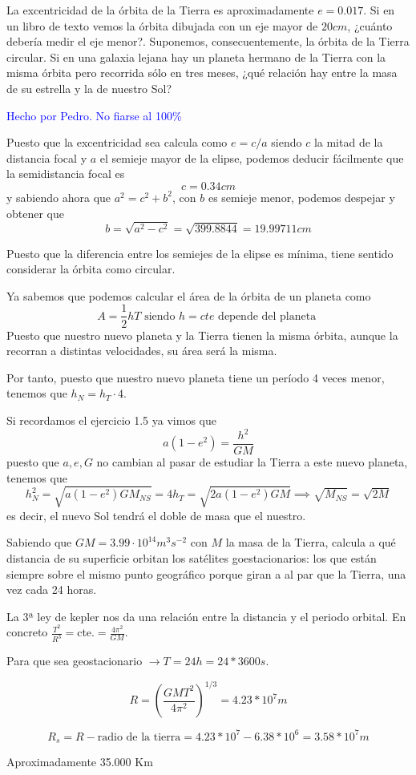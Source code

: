 \begin{problem}[8]
La excentricidad de la órbita de la Tierra es aproximadamente $e=0.017$. Si en un libro de texto vemos la órbita dibujada con un eje mayor de $20cm$, ¿cuánto debería medir el eje menor?. Suponemos, consecuentemente, la órbita de la Tierra circular. Si en una galaxia lejana hay un planeta hermano de la Tierra con la misma órbita pero recorrida sólo en tres meses, ¿qué relación hay entre la masa de su estrella y la de nuestro Sol?

\solution
\textcolor{blue}{Hecho por Pedro. No fiarse al 100\%}

Puesto que la excentricidad sea calcula como $e=c/a$ siendo $c$ la mitad de la distancia focal y $a$ el semieje mayor de la elipse, podemos deducir fácilmente que la semidistancia focal es
\[c= 0.34cm\]
y sabiendo ahora que $a^2 = c^2+b^2$, con $b$ es semieje menor, podemos despejar y obtener que
\[b = \sqrt{a^2-c^2}=\sqrt{399.8844} = 19.99711 cm\]

Puesto que la diferencia entre los semiejes de la elipse es mínima, tiene sentido considerar la órbita como circular.

Ya sabemos que podemos calcular el área de la órbita de un planeta como
\[A = \frac{1}{2}h T \text{ siendo } h = cte \text{ depende del planeta }\]
Puesto que nuestro nuevo planeta y la Tierra tienen la misma órbita, aunque la recorran a distintas velocidades, su área será la misma.

Por tanto, puesto que nuestro nuevo planeta tiene un período 4 veces menor, tenemos que $h_N=h_T \cdot 4$.

Si recordamos el ejercicio 1.5 ya vimos que
\[a(1-e^2)=\frac{h^2}{GM}\]
puesto que $a,e,G$ no cambian al pasar de estudiar la Tierra a este nuevo planeta, tenemos que
\[h_N^2=\sqrt{a(1-e^2)GM_{NS}}=4h_T=\sqrt{2a(1-e^2)GM} \implies \sqrt{M_{NS}}=\sqrt{2M}\]
es decir, el nuevo Sol tendrá el doble de masa que el nuestro.

\end{problem}

\begin{problem}[9]
Sabiendo que $GM=3.99\cdot 10^{14}m^3s^{-2}$ con $M$ la masa de la Tierra, calcula a qué distancia de su superficie orbitan los satélites goestacionarios: los que están siempre sobre el mismo punto geográfico porque giran a al par que la Tierra, una vez cada 24 horas.
\solution

La 3ª ley de kepler nos da una relación entre la distancia y el periodo orbital. En concreto $ \frac{T^2}{R^3} = $cte.$ = \frac{4\pi^2}{GM} $.

Para que sea geostacionario $\rightarrow T = 24h = 24 * 3600 s$.

$$ R = \left( \frac{GMT^2}{4\pi^2} \right)^{1/3} = 4.23 * 10^7 m $$

$$ R_{s} = R - \text{radio de la tierra} = 4.23 * 10^{7} - 6.38 * 10^{6} = 3.58 * 10^{7} m $$

Aproximadamente 35.000 Km


\end{problem}

